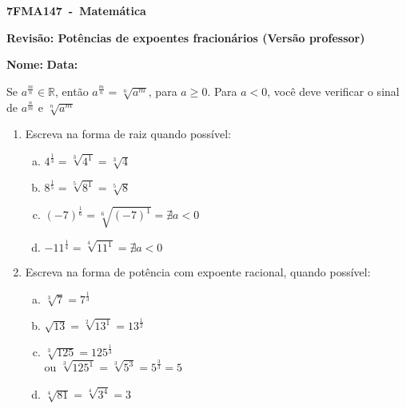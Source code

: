 \documentclass[a4paper,14pt]{article}
\begin{document}
	
	\noindent\textbf{7FMA147~-~Matemática} 
	
	\begin{center}
		\textbf{Revisão: Potências de expoentes fracionários (Versão professor)}
	\end{center}
	
	
	\noindent\textbf{Nome:} \underline{\hspace{10cm}}
    \noindent\textbf{Data:} \underline{\hspace{4cm}}
	
	
	\begin{multicols}{2}
		Se $a^\frac{m}{n} \in \mathbb{R}$, então $a^\frac{m}{n} = \sqrt[n]{a^m}$, para $a \geq 0$. Para $a < 0$, você deve verificar o sinal de $a^\frac{n}{m}$ e $\sqrt[n]{a^m}$
	\begin{enumerate}	
		\item Escreva na forma de raiz quando possível:
		\begin{enumerate}[a)]
			\item $4^\frac{1}{3} = \sqrt[3]{4^1} = \sqrt[3]{4}$ \\
			\item $8^\frac{1}{5} = \sqrt[5]{8^1} = \sqrt[5]{8} $\\
			\item $(-7)^\frac{1}{6} = \sqrt[6]{(-7)^1} = \nexists a < 0$ \\
			\item $-11^\frac{1}{4} = \sqrt[4]{11^1} = \nexists a < 0$ \\
	    \end{enumerate}
        \item Escreva na forma de potência com expoente racional, quando possível:
        \begin{enumerate}[a)]
        	\item $\sqrt[3]{7} = 7^\frac{1}{3}$ \\
        	\item $\sqrt{13} = \sqrt[2]{13^1} = 13^\frac{1}{2}$ \\
        	\item $\sqrt[3]{125} = 125^\frac{1}{3}$ \\ ou $\sqrt[3]{125^1} = \sqrt[3]{5^3} = 5^\frac{3}{3} = 5$ \\
        	\item $\sqrt[4]{81} = \sqrt[4]{3^4} = 3$ \\

\end{enumerate}
\end{enumerate}
\end{multicols}
\end{document}
